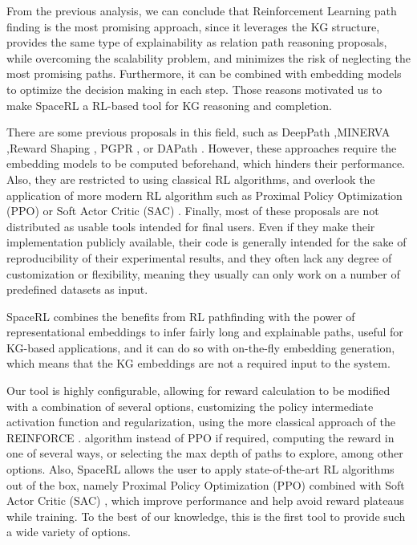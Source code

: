 From the previous analysis, we can conclude that Reinforcement Learning path finding is the most promising approach, since it leverages the KG structure,  provides the same type of explainability as relation path reasoning proposals, while overcoming the scalability problem, and minimizes the risk of neglecting the most promising paths. Furthermore, it can be combined with embedding models to optimize the decision making in each step. Those reasons motivated us to make SpaceRL a RL-based tool for KG reasoning and completion.

There are some previous proposals in this field, such as DeepPath \cite{xiong2017deeppath},MINERVA \cite{das2017go},Reward Shaping \cite{lin2018multi}, PGPR \cite{xian2019reinforcement}, or DAPath \cite{tiwari2021dapath}.
However, these approaches require the embedding models to be computed beforehand, which hinders their performance. Also, they are restricted to using classical RL algorithms, and overlook the application of more modern RL algorithm such as Proximal Policy Optimization (PPO)
\cite{schulman2017proximal} or Soft Actor Critic (SAC) \cite{haarnoja2018soft}.
Finally, most of these proposals are not distributed as usable tools intended for final users. Even if they make their implementation publicly available, their code is generally intended for the sake of reproducibility of their experimental results, and they often lack any degree of customization or flexibility, meaning they usually can only work on a number of predefined datasets as input.

SpaceRL combines the benefits from RL pathfinding with the power of representational embeddings to infer fairly long and explainable paths, useful for KG-based applications, and it can do so with on-the-fly embedding generation, which means that the KG embeddings are not a required input to the system.

Our tool is highly configurable, allowing for reward calculation to be modified with a combination of several options, customizing the policy intermediate activation function and regularization, using the more classical approach of the REINFORCE \cite{sutton1999policy}.
algorithm instead of PPO if required, computing the reward in one of several ways, or selecting the max depth of paths to explore, among other options. Also, SpaceRL allows the user to apply state-of-the-art RL algorithms out of the box, namely Proximal Policy Optimization (PPO)\cite{schulman2017proximal} combined with Soft Actor Critic (SAC) \cite{haarnoja2018soft}, which improve performance and help avoid reward plateaus while training. To the best of our knowledge, this is the first tool to provide such a wide variety of options.

